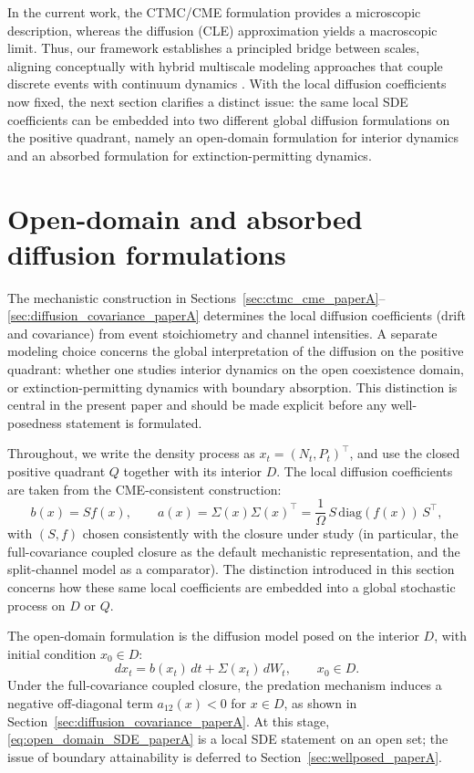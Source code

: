 \documentclass[pdflatex,sn-mathphys-ay]{sn-jnl}
\theoremstyle{thmstyleone}
\theoremstyle{definition}
\theoremstyle{remark}
\begin{document}
In the current work, the CTMC/CME formulation provides a microscopic description, whereas the diffusion (CLE) approximation yields a macroscopic limit. Thus, our framework establishes a principled bridge between scales, aligning conceptually with hybrid multiscale modeling approaches that couple discrete events with continuum dynamics \citep{liu_bidirectional_2025}.
With the local diffusion coefficients now fixed, the next section clarifies a distinct issue: the same local SDE coefficients can be embedded into two different global diffusion formulations on the positive quadrant, namely an open-domain formulation for interior dynamics and an absorbed formulation for extinction-permitting dynamics.


\section{Open-domain and absorbed diffusion formulations}
\label{sec:formulations_paperA}

The mechanistic construction in Sections~\ref{sec:ctmc_cme_paperA}--\ref{sec:diffusion_covariance_paperA} determines the local diffusion coefficients (drift and covariance) from event stoichiometry and channel intensities. A separate modeling choice concerns the global interpretation of the diffusion on the positive quadrant: whether one studies interior dynamics on the open coexistence domain, or extinction-permitting dynamics with boundary absorption. This distinction is central in the present paper and should be made explicit before any well-posedness statement is formulated.

Throughout, we write the density process as \(x_t=(N_t,P_t)^\top\), and use the closed positive quadrant $Q$ together with its interior $D$.
The local diffusion coefficients are taken from the CME-consistent construction:
\begin{equation}
\label{eq:common_local_coeffs_paperA}
b(x)=S f(x),\qquad
a(x)=\Sigma(x)\Sigma(x)^\top=\frac{1}{\Omega}\,S\,\mathrm{diag}(f(x))\,S^\top,
\end{equation}
with \((S,f)\) chosen consistently with the closure under study (in particular, the full-covariance coupled closure as the default mechanistic representation, and the split-channel model as a comparator). The distinction introduced in this section concerns how these same local coefficients are embedded into a global stochastic process on \(D\) or \(Q\).

The open-domain formulation is the diffusion model posed on the interior \(D\), with initial condition \(x_0\in D\):
\begin{equation}
\label{eq:open_domain_SDE_paperA}
dx_t=b(x_t)\,dt+\Sigma(x_t)\,dW_t,
\qquad x_0\in D.
\end{equation}
Under the full-covariance coupled closure, the predation mechanism induces a negative off-diagonal term \(a_{12}(x)<0\) for \(x\in D\), as shown in Section~\ref{sec:diffusion_covariance_paperA}. At this stage, \eqref{eq:open_domain_SDE_paperA} is a local SDE statement on an open set; the issue of boundary attainability is deferred to Section~\ref{sec:wellposed_paperA}.
\end{document}
